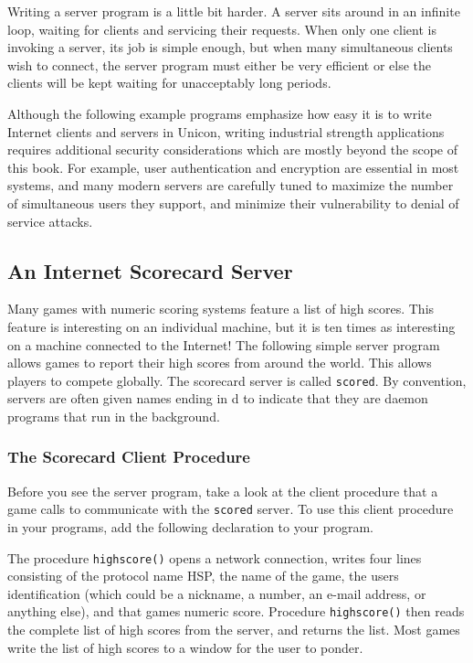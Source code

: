 Writing a server program is a little bit harder. A server sits around in
an infinite loop, waiting for clients and servicing their requests.
When only one client is invoking a server, its job is simple enough,
but when many simultaneous clients wish to connect, the server program
must either be very efficient or else the clients will be kept waiting
for unacceptably long periods.

Although the following example programs emphasize how easy it is to
write Internet clients and servers in Unicon, writing
{\textquotedbl}industrial strength{\textquotedbl} applications requires
additional security considerations which are mostly beyond the scope of
this book. For example, user authentication and encryption are
essential in most systems, and many modern servers are carefully tuned
to maximize the number of simultaneous users they support, and minimize
their vulnerability to denial of service attacks.

\subsection{An Internet Scorecard Server}

Many games with numeric scoring systems feature a list of high scores.
This feature is interesting on an individual machine, but it is ten
times as interesting on a machine connected to the Internet! The
following simple server program allows games to report
their high scores from around the world. This allows players to compete
globally. The scorecard server is called \texttt{scored}. By
convention, servers are often given names ending in
{\textquotedbl}d{\textquotedbl} to indicate that they are daemon
programs that run in the background.

\subsubsection{The Scorecard Client Procedure}

Before you see the server program, take a look at the client procedure
that a game calls to communicate with the \texttt{scored} server. To
use this client procedure in your programs, add the following
declaration to your program.


The procedure \texttt{highscore()} opens a network connection, writes
four lines consisting of the protocol name
{\textquotedbl}HSP{\textquotedbl}, the name of the game, the
user{\textquotesingle}s identification (which could be a nickname, a
number, an e-mail address, or anything else), and that
game{\textquotesingle}s numeric score. Procedure \texttt{highscore()}
then reads the complete list of high scores from the server, and
returns the list. Most games write the list of high scores to a window
for the user to ponder.

